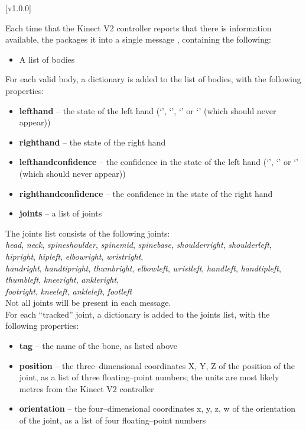 [v1.0.0]

Each time that the Kinect V2 controller reports that there is information available,
the  packages it into a single message
\openSq{}\closeSq, containing the following:
\begin{itemize}
\item A list of bodies
\end{itemize}

For each valid body, a dictionary \openSq{}\closeSq{} is added to the list
of bodies, with the following properties:
\begin{itemize}
\item \textbf{lefthand} -- the state of the left hand (`', `',
`' or `' (which should never appear))
\item \textbf{righthand} -- the state of the right hand
\item \textbf{lefthandconfidence} -- the confidence in the state of the left hand
(`', `' or `' (which should never appear))
\item \textbf{righthandconfidence} -- the confidence in the state of the right hand
\item \textbf{joints} -- a list of joints
\end{itemize}

The joints list consists of the following joints:\\
\textbraceleft{} \emph{head}, \emph{neck}, \emph{spineshoulder}, \emph{spinemid},
\emph{spinebase}, \emph{shoulderright}, \emph{shoulderleft}, \emph{hipright},
\emph{hipleft}, \emph{elbowright}, \emph{wristright},\\
\emph{handright}, \emph{handtipright}, \emph{thumbright}, \emph{elbowleft},
\emph{wristleft}, \emph{handleft}, \emph{handtipleft}, \emph{thumbleft}, \emph{kneeright},
\emph{ankleright},\\
\emph{footright}, \emph{kneeleft}, \emph{ankleleft}, \emph{footleft} \textbraceright\\

Not all joints will be present in each message.\\

For each ``tracked'' joint, a dictionary is added to the joints list, with the following
properties:
\begin{itemize}
\item \textbf{tag} -- the name of the bone, as listed above
\item \textbf{position} -- the three--dimensional coordinates \openSq{}X, Y,
Z\closeSq{} of the position of the joint, as a list of three floating--point
numbers; the units are most likely metres from the Kinect V2 controller
\item \textbf{orientation} -- the four--dimensional coordinates \openSq{}x, y,
z, w\closeSq{} of the orientation of the joint, as a list of four floating--point
numbers
\end{itemize}
\primaryEnd{}
